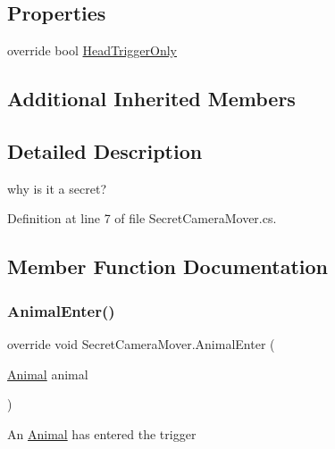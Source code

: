 \subsection*{Properties}
\begin{DoxyCompactItemize}
\item 
override bool \mbox{\hyperlink{class_secret_camera_mover_a84e8ff76db93c7ddc16bed5dcb668e3b}{Head\+Trigger\+Only}}
\end{DoxyCompactItemize}
\subsection*{Additional Inherited Members}


\subsection{Detailed Description}
why is it a secret? 



Definition at line 7 of file Secret\+Camera\+Mover.\+cs.



\subsection{Member Function Documentation}
\mbox{\label{class_secret_camera_mover_a167a1c9a1b6de66a6789e4f9c4eb2633}} 
\subsubsection{\texorpdfstring{Animal\+Enter()}{AnimalEnter()}}
{\footnotesize\ttfamily override void Secret\+Camera\+Mover.\+Animal\+Enter (\begin{DoxyParamCaption}\item[{\mbox{\hyperlink{class_animal}{Animal}}}]{animal }\end{DoxyParamCaption})\hspace{0.3cm}{\ttfamily [virtual]}}



An \mbox{\hyperlink{class_animal}{Animal}} has entered the trigger 



